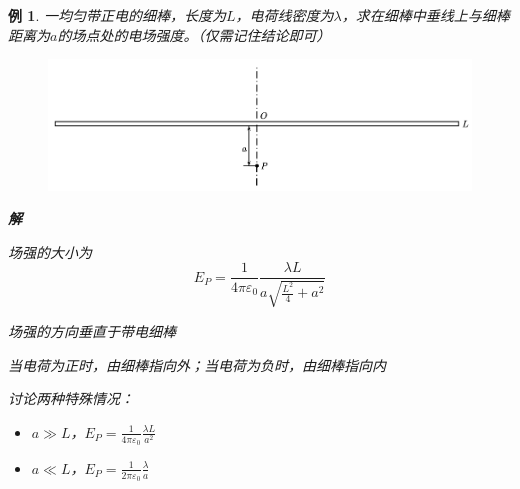 \documentclass[12pt, a4paper, twoside]{ctexbook}
\newtheorem{example}[theorem]{例}
\begin{document}
\begin{example}
    一均匀带正电的细棒，长度为$L$，电荷线密度为$\lambda$，求在细棒中垂线上与细棒距离为$a$的场点处的电场强度。{\sonti （仅需记住结论即可）}
    \begin{figure}[H]
        \centerline{\includegraphics[scale=0.8]{CH09EX01.pdf}}
    \end{figure}
    \noindent\textbf{解}

    场强的大小为
    $$
    E_P=\frac{1}{4\pi\varepsilon_0}\frac{\lambda L}{a\sqrt{\frac{L^2}{4}+a^2}}
    $$
    
    场强的方向垂直于带电细棒
    
    当电荷为正时，由细棒指向外；当电荷为负时，由细棒指向内
    
    {\sonti 讨论两种特殊情况}：
    \begin{itemize}
        \item $a\gg L$，$E_P=\frac{1}{4\pi\varepsilon_0}\frac{\lambda L}{a^2}$
        \item $a\ll L$，$E_P=\frac{1}{2\pi\varepsilon_0}\frac{\lambda}{a}$
    \end{itemize}
\end{example}
\newpage
\end{document}
